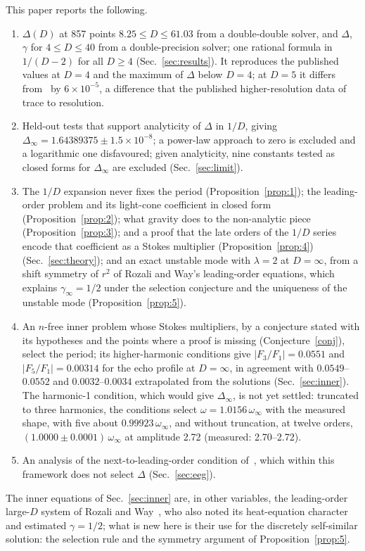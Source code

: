 \documentclass[aps,prd,onecolumn,superscriptaddress,nofootinbib,10pt]{revtex4-2}
\newcommand{\Dinf}{\Delta_\infty}
\begin{document}
This paper reports the following.
\begin{enumerate}
\item $\Delta(D)$ at 857 points $8.25 \le D \le 61.03$ from a double-double solver, and $\Delta$, $\gamma$ for
$4 \le D \le 40$ from a double-precision solver; one rational formula in $1/(D-2)$ for all $D \ge 4$
(Sec.~\ref{sec:results}). It reproduces the published values at $D = 4$ and the maximum of $\Delta$ below $D = 4$; at
$D = 5$ it differs from~\cite{EckerEtAl2026} by $6\times10^{-5}$, a difference that the published higher-resolution
data of~\cite{EckerEtAl2026} trace to resolution.
\item Held-out tests that support analyticity of $\Delta$ in $1/D$, giving $\Dinf = 1.64389375 \pm 1.5\times10^{-8}$; a
power-law approach to zero is excluded and a logarithmic one disfavoured; given analyticity, nine constants tested as
closed forms for $\Dinf$ are excluded (Sec.~\ref{sec:limit}).
\item The $1/D$ expansion never fixes the period (Proposition~\ref{prop:1}); the leading-order problem and its
light-cone coefficient in closed form (Proposition~\ref{prop:2}); what gravity does to the non-analytic piece
(Proposition~\ref{prop:3}); and a proof that the late orders of the $1/D$ series encode that coefficient as a Stokes multiplier
(Proposition~\ref{prop:4}) (Sec.~\ref{sec:theory}); and an exact unstable mode with $\lambda = 2$ at $D = \infty$, from a shift
symmetry of $r^2$ of Rozali and Way's leading-order equations, which explains $\gamma_\infty = 1/2$ under the selection
conjecture and the uniqueness of the unstable mode (Proposition~\ref{prop:5}).
\item An $n$-free inner problem whose Stokes multipliers, by a conjecture stated with its hypotheses and the points where
a proof is missing (Conjecture~\ref{conj}), select the period; its
higher-harmonic conditions give $|F_3/F_1| = 0.0551$ and $|F_5/F_1| = 0.00314$ for the echo profile at
$D = \infty$, in agreement with $0.0549$--$0.0552$ and $0.0032$--$0.0034$ extrapolated from the solutions
(Sec.~\ref{sec:inner}). The harmonic-1 condition, which would give $\Dinf$, is not yet settled: truncated to three
harmonics, the conditions select $\omega = 1.0156\,\omega_\infty$ with the measured shape, with five about
$0.99923\,\omega_\infty$, and without
truncation, at twelve orders, $(1.0000 \pm 0.0001)\,\omega_\infty$ at amplitude 2.72 (measured: 2.70--2.72).
\item An analysis of the next-to-leading-order condition of~\cite{EckerEckerGrumiller2026}, which within this framework
does not select $\Delta$ (Sec.~\ref{sec:eeg}).
\end{enumerate}
The inner equations of Sec.~\ref{sec:inner} are, in other variables, the leading-order large-$D$ system of Rozali and
Way~\cite{RozaliWay2018}, who also noted its heat-equation character and estimated $\gamma = 1/2$; what is new here is
their use for the discretely self-similar solution: the selection rule and the symmetry argument of
Proposition~\ref{prop:5}.
\end{document}
